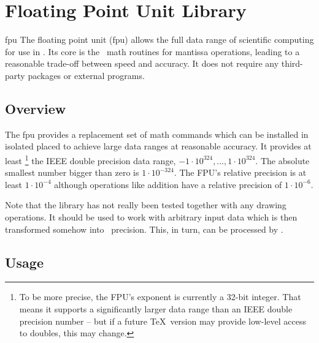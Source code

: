 %
%
%


\section[library-fpu]{Floating Point Unit Library}
\label{pgfmath-floatunit}
\label{section-library-fpu}

{}

\begingroup
{}

\begin{pgflibrary}{fpu}
    The floating point unit (fpu) allows the full data range of scientific
    computing for use in \pgfname. Its core is the \pgfname\ math routines for
    mantissa operations, leading to a reasonable trade-off between speed and
    accuracy. It does not require any third-party packages or external
    programs.
\end{pgflibrary}


\subsection{Overview}

The fpu provides a replacement set of math commands which can be installed in
isolated placed to achieve large data ranges at reasonable accuracy. It
provides at least%
    \footnote{To be more precise, the FPU's exponent is currently a 32-bit
    integer. That means it supports a significantly larger data range than an
    IEEE double precision number -- but if a future \TeX\ version may provide
    low-level access to doubles, this may change.}%
the IEEE double precision data range, $-1 \cdot 10^{324}, \dotsc,
1\cdot 10^{324}$. The absolute smallest number bigger than zero is
$1 \cdot 10^{-324}$. The FPU's relative precision is at least
$1 \cdot 10^{-4}$ although operations like addition have a relative
precision of $1 \cdot 10^{-6}$.

Note that the library has not really been tested together with any drawing
operations. It should be used to work with arbitrary input data which is then
transformed somehow into \pgfname\ precision. This, in turn, can be processed
by \pgfname.


\subsection{Usage}

